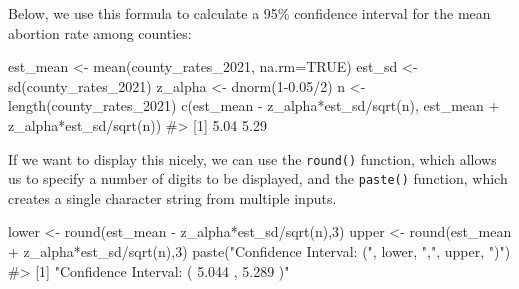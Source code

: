 \documentclass[
  letterpaper,
]{krantz}
\makeatletter
\newenvironment{Shaded}{\begin{snugshade}}{\end{snugshade}}
\newcommand{\AttributeTok}[1]{\textcolor[rgb]{0.40,0.45,0.13}{#1}}
\newcommand{\CommentTok}[1]{\textcolor[rgb]{0.37,0.37,0.37}{#1}}
\newcommand{\ConstantTok}[1]{\textcolor[rgb]{0.56,0.35,0.01}{#1}}
\newcommand{\DecValTok}[1]{\textcolor[rgb]{0.68,0.00,0.00}{#1}}
\newcommand{\FloatTok}[1]{\textcolor[rgb]{0.68,0.00,0.00}{#1}}
\newcommand{\FunctionTok}[1]{\textcolor[rgb]{0.28,0.35,0.67}{#1}}
\newcommand{\NormalTok}[1]{\textcolor[rgb]{0.00,0.23,0.31}{#1}}
\newcommand{\OtherTok}[1]{\textcolor[rgb]{0.00,0.23,0.31}{#1}}
\newcommand{\SpecialCharTok}[1]{\textcolor[rgb]{0.37,0.37,0.37}{#1}}
\newcommand{\StringTok}[1]{\textcolor[rgb]{0.13,0.47,0.30}{#1}}
\newenvironment{kframe}{%
\medskip{}
\setlength{\fboxsep}{.8em}
 \def\at@end@of@kframe{}%
 \ifinner\ifhmode%
  \def\at@end@of@kframe{\end{minipage}}%
  \begin{minipage}{\columnwidth}%
 \fi\fi%
 \def\FrameCommand##1{\hskip\@totalleftmargin \hskip-\fboxsep
 \colorbox{shadecolor}{##1}\hskip-\fboxsep
     \hskip-\linewidth \hskip-\@totalleftmargin \hskip\columnwidth}%
 \MakeFramed {\advance\hsize-\width
   \@totalleftmargin\z@ \linewidth\hsize
   \@setminipage}}%
 {\par\unskip\endMakeFramed%
 \at@end@of@kframe}
\renewenvironment{Shaded}{\begin{kframe}}{\end{kframe}}
\makeatother
\begin{document}
Below, we use this formula to calculate a 95\% confidence interval for
the mean abortion rate among counties:

\begin{Shaded}
\begin{Highlighting}[]
\NormalTok{est\_mean }\OtherTok{\textless{}{-}} \FunctionTok{mean}\NormalTok{(county\_rates\_2021, }\AttributeTok{na.rm=}\ConstantTok{TRUE}\NormalTok{)}
\NormalTok{est\_sd }\OtherTok{\textless{}{-}} \FunctionTok{sd}\NormalTok{(county\_rates\_2021)}
\NormalTok{z\_alpha }\OtherTok{\textless{}{-}} \FunctionTok{dnorm}\NormalTok{(}\DecValTok{1}\FloatTok{{-}0.05}\SpecialCharTok{/}\DecValTok{2}\NormalTok{)}
\NormalTok{n }\OtherTok{\textless{}{-}} \FunctionTok{length}\NormalTok{(county\_rates\_2021)}
\FunctionTok{c}\NormalTok{(est\_mean }\SpecialCharTok{{-}}\NormalTok{ z\_alpha}\SpecialCharTok{*}\NormalTok{est\_sd}\SpecialCharTok{/}\FunctionTok{sqrt}\NormalTok{(n), est\_mean }\SpecialCharTok{+}\NormalTok{ z\_alpha}\SpecialCharTok{*}\NormalTok{est\_sd}\SpecialCharTok{/}\FunctionTok{sqrt}\NormalTok{(n))}
\CommentTok{\#\textgreater{} [1] 5.04 5.29}
\end{Highlighting}
\end{Shaded}

If we want to display this nicely, we can use the \texttt{round()}
function, which allows us to specify a number of digits to be displayed,
and the \texttt{paste()} function, which creates a single character
string from multiple inputs.

\begin{Shaded}
\begin{Highlighting}[]
\NormalTok{lower }\OtherTok{\textless{}{-}} \FunctionTok{round}\NormalTok{(est\_mean }\SpecialCharTok{{-}}\NormalTok{ z\_alpha}\SpecialCharTok{*}\NormalTok{est\_sd}\SpecialCharTok{/}\FunctionTok{sqrt}\NormalTok{(n),}\DecValTok{3}\NormalTok{)}
\NormalTok{upper }\OtherTok{\textless{}{-}} \FunctionTok{round}\NormalTok{(est\_mean }\SpecialCharTok{+}\NormalTok{ z\_alpha}\SpecialCharTok{*}\NormalTok{est\_sd}\SpecialCharTok{/}\FunctionTok{sqrt}\NormalTok{(n),}\DecValTok{3}\NormalTok{)}
\FunctionTok{paste}\NormalTok{(}\StringTok{"Confidence Interval: ("}\NormalTok{, lower, }\StringTok{","}\NormalTok{, upper, }\StringTok{")"}\NormalTok{)}
\CommentTok{\#\textgreater{} [1] "Confidence Interval: ( 5.044 , 5.289 )"}
\end{Highlighting}
\end{Shaded}
\end{document}
